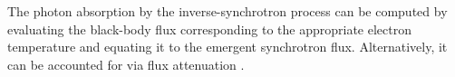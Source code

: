 %
%
The photon absorption by the inverse-synchrotron process can be computed by evaluating 
the black-body flux corresponding to the appropriate electron temperature 
and equating it to the emergent synchrotron flux. Alternatively, it can be accounted for 
via flux attenuation \citep{Dermer:2009}.
%

